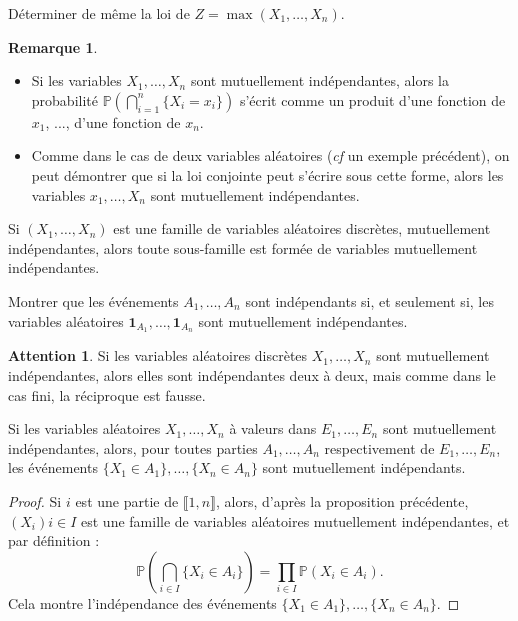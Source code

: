\documentclass[french]{article}
\renewcommand{\P}{\mathbb{P}}
\theoremstyle{plain}
\theoremstyle{definition}
\newtheorem*{rmq}{Remarque}
\newtheorem*{attention}{Attention}
\theoremstyle{remark}
\begin{document}
\begin{exo}
	Déterminer de même la loi de $Z=\max(X_1,\ldots,X_n)$.
\end{exo}

\begin{rmq}
	\begin{itemize}
		\item Si les variables $X_1,\ldots,X_n$ sont mutuellement indépendantes, alors la probabilité $\P\displaystyle\left(\bigcap_{i=1}^n\{X_i=x_i\}\right)$ s'écrit comme un produit d'une fonction de $x_1$, ..., d'une fonction de $x_n$.
		\item Comme dans le cas de deux variables aléatoires (\textit{cf} un exemple précédent), on peut démontrer que si la loi conjointe peut s'écrire sous cette forme, alors les variables $x_1,\ldots,X_n$ sont mutuellement indépendantes.
	\end{itemize}
\end{rmq}

\begin{prop}%
	Si $(X_1,\ldots,X_n)$ est une famille de variables aléatoires discrètes, mutuellement indépendantes, alors toute sous-famille est formée de variables mutuellement indépendantes.
\end{prop}

\begin{exo}
	Montrer que les événements $A_1,\ldots,A_n$ sont indépendants si, et seulement si, les variables aléatoires $\textbf{1}_{A_1},\ldots,\textbf{1}_{A_n}$ sont mutuellement indépendantes.
\end{exo}

\begin{attention}
	Si les variables aléatoires discrètes $X_1,\ldots,X_n$ sont mutuellement indépendantes, alors elles sont indépendantes deux à deux, mais comme dans le cas fini, la réciproque est fausse.
\end{attention}

\begin{cor}%
	Si les variables aléatoires $X_1,\ldots,X_n$ à valeurs dans $E_1,\ldots,E_n$ sont mutuellement indépendantes, alors, pour toutes parties $A_1,\ldots,A_n$ respectivement de $E_1,\ldots,E_n$, les événements $\{X_1\in A_1\},\ldots,\{X_n\in A_n\}$ sont mutuellement indépendants.
\end{cor}
\begin{proof}
	Si $i$ est une partie de $\llbracket1,n\rrbracket$, alors, d'après la proposition précédente, $(X_i){i\in I}$ est une famille de variables aléatoires mutuellement indépendantes, et par définition :
	$$\P\left(\bigcap_{i\in I}\{X_i\in A_i\}\right)=\prod_{i\in I}\P(X_i\in A_i).$$ Cela montre l'indépendance des événements $\{X_1\in A_1\},\ldots,\{X_n\in A_n\}$.
\end{proof}
\end{document}
